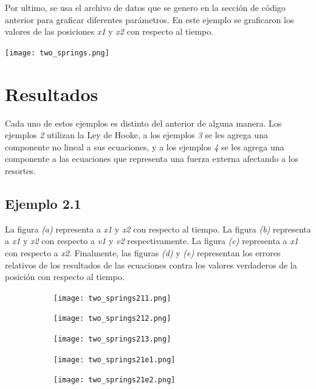 \documentclass{article}
\begin{document}
Por ultimo, se usa el archivo de datos que se genero en la sección de código anterior para graficar diferentes parámetros. En este ejemplo se graficaron los valores de las posiciones \textit{x1} y \textit{x2} con respecto al tiempo.

\begin{center}
	\texttt{[image: two\_springs.png]}
 
\end{center}
\vspace{0.3cm}

\section{Resultados}

Cada uno de estos ejemplos es distinto del anterior de alguna manera. Los ejemplos \textit{2} utilizan la Ley de Hooke, a los ejemplos \textit{3} se les agrega una componente no lineal a sus ecuaciones, y a los ejemplos \textit{4} se les agrega una componente a las ecuaciones que representa una fuerza externa afectando a los resortes.

\subsection*{Ejemplo 2.1}

La figura \textit{(a)} representa a \textit{x1} y \textit{x2} con respecto al tiempo. La figura \textit{(b)} representa a \textit{x1} y \textit{x2} con respecto a \textit{v1} y \textit{v2} respectivamente. La figura \textit{(c)} representa a \textit{x1} con respecto a \textit{x2}.
Finalmente, las figuras \textit{(d)} y \textit{(e)} representan los errores relativos de los resultados de las ecuaciones contra los valores verdaderos de la posición con respecto al tiempo.

\begin{figure}[h!]
  \centering
  \begin{subfigure}[b]{0.32\linewidth}
    \texttt{[image: two\_springs211.png]}
     \caption{}
  \end{subfigure}
  \begin{subfigure}[b]{0.32\linewidth}
    \texttt{[image: two\_springs212.png]}
    \caption{}
  \end{subfigure}
  \begin{subfigure}[b]{0.32\linewidth}
    \texttt{[image: two\_springs213.png]}
    \caption{}
  \end{subfigure}
  \begin{subfigure}[b]{0.45\linewidth}
    \texttt{[image: two\_springs21e1.png]}
    \caption{}
  \end{subfigure}
  \begin{subfigure}[b]{0.45\linewidth}
    \texttt{[image: two\_springs21e2.png]}
    \caption{}
  \end{subfigure}
\end{figure}
\end{document}

